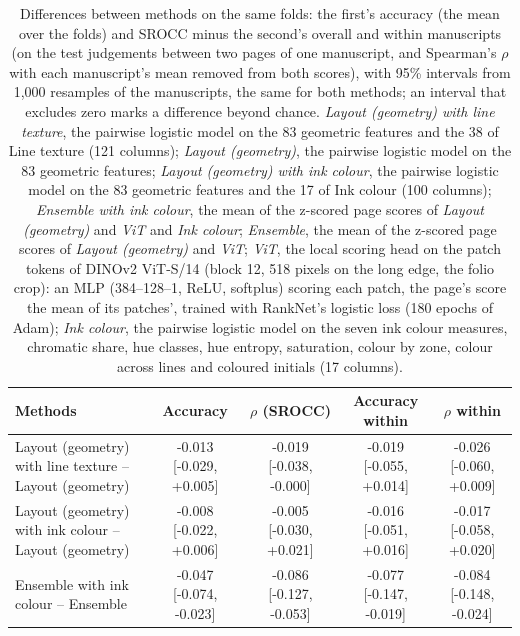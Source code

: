 \begin{table}[htbp]
  \centering
  \caption{Differences between methods on the same folds: the first's accuracy (the mean over the folds) and SROCC minus the second's overall and within manuscripts (on the test judgements between two pages of one manuscript, and Spearman's $\rho$ with each manuscript's mean removed from both scores), with 95\% intervals from 1,000 resamples of the manuscripts, the same for both methods; an interval that excludes zero marks a difference beyond chance. \emph{Layout (geometry) with line texture}, the pairwise logistic model on the 83 geometric features and the 38 of Line texture (121 columns); \emph{Layout (geometry)}, the pairwise logistic model on the 83 geometric features; \emph{Layout (geometry) with ink colour}, the pairwise logistic model on the 83 geometric features and the 17 of Ink colour (100 columns); \emph{Ensemble with ink colour}, the mean of the z-scored page scores of \emph{Layout (geometry)} and \emph{ViT} and \emph{Ink colour}; \emph{Ensemble}, the mean of the z-scored page scores of \emph{Layout (geometry)} and \emph{ViT}; \emph{ViT}, the local scoring head on the patch tokens of DINOv2 ViT-S/14 (block 12, 518 pixels on the long edge, the folio crop): an MLP (384--128--1, ReLU, softplus) scoring each patch, the page's score the mean of its patches', trained with RankNet's logistic loss (180 epochs of Adam); \emph{Ink colour}, the pairwise logistic model on the seven ink colour measures, chromatic share, hue classes, hue entropy, saturation, colour by zone, colour across lines and coloured initials (17 columns).}
  \label{tab:colour_differences}
  \begin{tabular}{lcccc}
    \toprule
    Methods & Accuracy & $\rho$ (SROCC) & Accuracy within & $\rho$ within \\
    \midrule
    Layout (geometry) with line texture -- Layout (geometry) & -0.013 [-0.029, +0.005] & -0.019 [-0.038, -0.000] & -0.019 [-0.055, +0.014] & -0.026 [-0.060, +0.009] \\
    Layout (geometry) with ink colour -- Layout (geometry) & -0.008 [-0.022, +0.006] & -0.005 [-0.030, +0.021] & -0.016 [-0.051, +0.016] & -0.017 [-0.058, +0.020] \\
    Ensemble with ink colour -- Ensemble & -0.047 [-0.074, -0.023] & -0.086 [-0.127, -0.053] & -0.077 [-0.147, -0.019] & -0.084 [-0.148, -0.024] \\
    \bottomrule
  \end{tabular}
\end{table}
